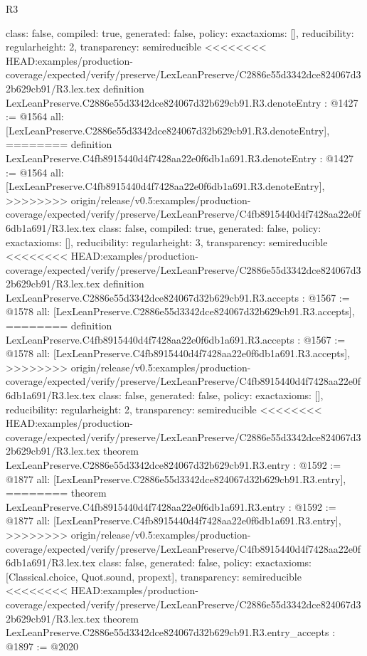 \begin{lexlean}{R3}
\begin{coremodule}
{{{{{{{{{{{{  class: false,
  compiled: true,
  generated: false,
  policy: exact{axioms: []},
  reducibility: regular{height: 2},
  transparency: semireducible
}
<<<<<<<< HEAD:examples/production-coverage/expected/verify/preserve/LexLeanPreserve/C2886e55d3342dce824067d32b629cb91/R3.lex.tex
definition LexLeanPreserve.C2886e55d3342dce824067d32b629cb91.R3.denoteEntry : @1427 := @1564 {
  all: [LexLeanPreserve.C2886e55d3342dce824067d32b629cb91.R3.denoteEntry],
========
definition LexLeanPreserve.C4fb8915440d4f7428aa22e0f6db1a691.R3.denoteEntry : @1427 := @1564 {
  all: [LexLeanPreserve.C4fb8915440d4f7428aa22e0f6db1a691.R3.denoteEntry],
>>>>>>>> origin/release/v0.5:examples/production-coverage/expected/verify/preserve/LexLeanPreserve/C4fb8915440d4f7428aa22e0f6db1a691/R3.lex.tex
  class: false,
  compiled: true,
  generated: false,
  policy: exact{axioms: []},
  reducibility: regular{height: 3},
  transparency: semireducible
}
<<<<<<<< HEAD:examples/production-coverage/expected/verify/preserve/LexLeanPreserve/C2886e55d3342dce824067d32b629cb91/R3.lex.tex
definition LexLeanPreserve.C2886e55d3342dce824067d32b629cb91.R3.accepts : @1567 := @1578 {
  all: [LexLeanPreserve.C2886e55d3342dce824067d32b629cb91.R3.accepts],
========
definition LexLeanPreserve.C4fb8915440d4f7428aa22e0f6db1a691.R3.accepts : @1567 := @1578 {
  all: [LexLeanPreserve.C4fb8915440d4f7428aa22e0f6db1a691.R3.accepts],
>>>>>>>> origin/release/v0.5:examples/production-coverage/expected/verify/preserve/LexLeanPreserve/C4fb8915440d4f7428aa22e0f6db1a691/R3.lex.tex
  class: false,
  generated: false,
  policy: exact{axioms: []},
  reducibility: regular{height: 2},
  transparency: semireducible
}
<<<<<<<< HEAD:examples/production-coverage/expected/verify/preserve/LexLeanPreserve/C2886e55d3342dce824067d32b629cb91/R3.lex.tex
theorem LexLeanPreserve.C2886e55d3342dce824067d32b629cb91.R3.entry : @1592 := @1877 {
  all: [LexLeanPreserve.C2886e55d3342dce824067d32b629cb91.R3.entry],
========
theorem LexLeanPreserve.C4fb8915440d4f7428aa22e0f6db1a691.R3.entry : @1592 := @1877 {
  all: [LexLeanPreserve.C4fb8915440d4f7428aa22e0f6db1a691.R3.entry],
>>>>>>>> origin/release/v0.5:examples/production-coverage/expected/verify/preserve/LexLeanPreserve/C4fb8915440d4f7428aa22e0f6db1a691/R3.lex.tex
  class: false,
  generated: false,
  policy: exact{axioms: [Classical.choice, Quot.sound, propext]},
  transparency: semireducible
}
<<<<<<<< HEAD:examples/production-coverage/expected/verify/preserve/LexLeanPreserve/C2886e55d3342dce824067d32b629cb91/R3.lex.tex
theorem LexLeanPreserve.C2886e55d3342dce824067d32b629cb91.R3.entry_accepts : @1897 := @2020 {
}}}}}}}}}}}}}}}
\end{coremodule}
\end{lexlean}
